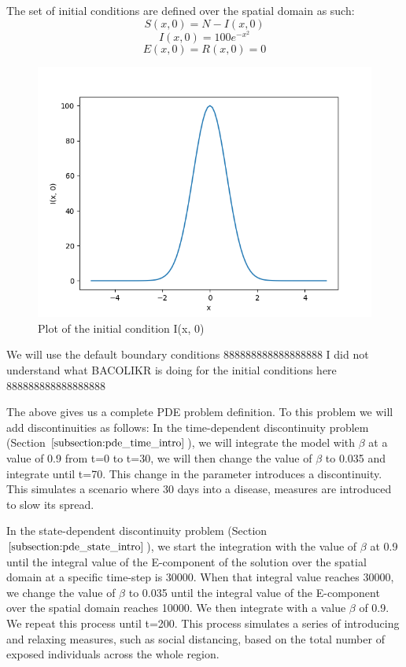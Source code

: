 \documentclass{article}
\begin{document}
The set of initial conditions are defined over the spatial domain as such:
\begin{equation}
S(x, 0) = N - I(x, 0)
\end{equation}
\begin{equation}
I(x, 0) = 100e^{-x^2}
\end{equation}
\begin{equation}
E(x, 0) = R(x, 0) = 0
\end{equation}

\begin{figure}[H]
\centering
\includegraphics[width=0.7\linewidth]{./figures/pde_I_0}
\caption{Plot of the initial condition I(x, 0)}
\label{fig:pde_I_0}
\end{figure}

We will use the default boundary conditions 888888888888888888 I did not understand what BACOLIKR is doing for the initial conditions here 888888888888888888

The above gives us a complete PDE problem definition. To this problem we will add discontinuities as follows: 
In the time-dependent discontinuity problem (Section $\ref{subsection:pde_time_intro}$), we will integrate the model with $\beta$ at a value of 0.9 from t=0 to t=30, we will then change the value of $\beta$ to 0.035 and integrate until t=70. This change in the parameter introduces a discontinuity. This simulates a scenario where 30 days into a disease, measures are introduced to slow its spread.

In the state-dependent discontinuity problem (Section $\ref{subsection:pde_state_intro}$), we start the integration with the value of $\beta$ at 0.9 until the integral value of the E-component of the solution over the spatial domain at a specific time-step is 30000. When that integral value reaches 30000, we change the value of $\beta$ to 0.035 until the integral value of the E-component over the spatial domain reaches 10000. We then integrate with a value $\beta$ of 0.9. We repeat this process until t=200. This process simulates a series of introducing and relaxing measures, such as social distancing, based on the total number of exposed individuals across the whole region.
\end{document}
